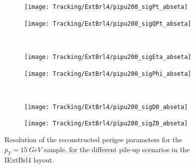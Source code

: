\documentclass[a4paper,twoside,12pt]{article}
\begin{document}
\begin{figure}
\begin{subfigure}{.5\linewidth}
\texttt{[image: Tracking/ExtBrl4/pipu200\_sigPt\_abseta]}
\caption{}
\label{fig:tracking:pi15_sigPt_abseta_IExtBrl4}
\end{subfigure}
\begin{subfigure}{.5\linewidth}
\texttt{[image: Tracking/ExtBrl4/pipu200\_sigQPt\_abseta]}
\caption{}
\label{fig:tracking:pi15_sigQPt_abseta_IExtBrl4}
\end{subfigure}\\[1ex]
\begin{subfigure}{.5\linewidth}
\texttt{[image: Tracking/ExtBrl4/pipu200\_sigEta\_abseta]}
\caption{}
\label{fig:tracking:pi15_sigEta_abseta_IExtBrl4}
\end{subfigure}
\begin{subfigure}{.5\linewidth}
\texttt{[image: Tracking/ExtBrl4/pipu200\_sigPhi\_abseta]}
\caption{}
\label{fig:tracking:pi15_sigPhi_abseta_IExtBrl4}
\end{subfigure}\\[1ex]
\begin{subfigure}{.5\linewidth}
\texttt{[image: Tracking/ExtBrl4/pipu200\_sigD0\_abseta]}
\caption{}
\label{fig:tracking:pi15_sigD0_abseta_IExtBrl4}
\end{subfigure}
\begin{subfigure}{.5\linewidth}
\texttt{[image: Tracking/ExtBrl4/pipu200\_sigZ0\_abseta]}
\caption{}
\label{fig:tracking:pi15_sigZ0_abseta_IExtBrl4}
\end{subfigure}
\caption{Resolution of the reconstructed perigee parameters for the $p_{T} = 15\ GeV$ sample, for the different pile-up scenarios in the IExtBrl4 layout.}
\label{fig:tracking:resolutionPileup_IExtBrl4}
\end{figure}
\end{document}
